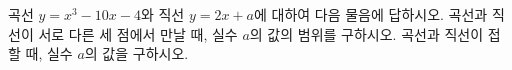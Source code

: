 곡선 $y=x^3-10x-4$와 직선 $y=2x+a$에 대하여 다음 물음에 답하시오.
 곡선과 직선이 서로 다른 세 점에서 만날 때, 실수 $a$의 값의 범위를 구하시오.
 곡선과 직선이 접할 때, 실수 $a$의 값을 구하시오.
